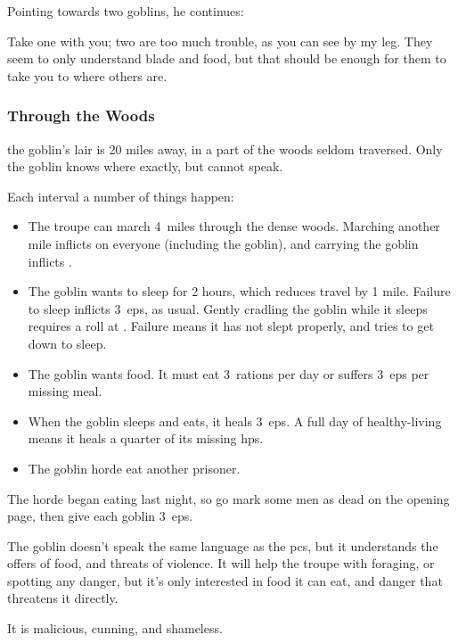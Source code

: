 \documentclass[10pt,twoside]{book}
\begin{document}
Pointing towards two goblins, he continues:

\begin{speechtext}
  Take one with you; two are too much trouble, as you can see by my leg.
  They seem to only understand blade and food, but that should be enough for them to take you to where others are.
\end{speechtext}

\subsubsection{Through the Woods}
the goblin's lair is 20 miles away, in a part of the woods seldom traversed.
Only the goblin knows where exactly, but cannot speak.

%
Each \gls{interval} a number of things happen:

\begin{itemize}
  \item
  The troupe can march 4~miles through the dense woods.
  Marching another mile inflicts  on everyone (including the goblin), and carrying the goblin inflicts .
  \item
  The goblin wants to sleep for 2 hours, which reduces travel by 1 mile.
  Failure to sleep inflicts 3~\glspl{ep}, as usual.
  Gently cradling the goblin while it sleeps requires a  roll at \tn[8].
  Failure means it has not slept properly, and tries to get down to sleep.
  \item
  The goblin wants food.
  It must eat 3~\glspl{ration} per day or suffers 3~\glspl{ep} per missing meal.
  \item
  When the goblin sleeps and eats, it heals 3~\glspl{ep}.
  A full day of healthy-living means it heals a quarter of its missing \glspl{hp}.
  \item
  The goblin horde eat another prisoner.
\end{itemize}

The horde began eating last night, so go mark some men as dead on the opening page, then give each goblin 3~\glspl{ep}.

The goblin doesn't speak the same language as the \glspl{pc}, but it understands the offers of food, and threats of violence.
It will help the troupe with foraging, or spotting any danger, but it's only interested in food it can eat, and danger that threatens it directly.

It is malicious, cunning, and shameless.
\end{document}

